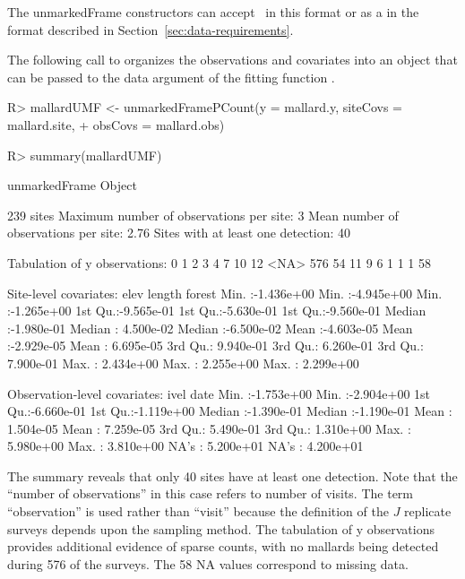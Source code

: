 \documentclass[article,shortnames]{jss}
\newcommand{\ocovs}{\code{obsCovs}}
\begin{document}
{The unmarkedFrame constructors can accept \ocovs\ in this  format or
as a  in the format described in
Section~\ref{sec:data-requirements}.

The following call to  organizes the observations
and covariates into an object that can be passed to the data argument of
the fitting function .

\begin{Schunk}
\begin{Sinput}
R> mallardUMF <- unmarkedFramePCount(y = mallard.y, siteCovs = mallard.site, 
+     obsCovs = mallard.obs)
\end{Sinput}
\end{Schunk}

\begin{Schunk}
\begin{Sinput}
R> summary(mallardUMF)
\end{Sinput}
\begin{Soutput}
unmarkedFrame Object

239 sites
Maximum number of observations per site: 3 
Mean number of observations per site: 2.76 
Sites with at least one detection: 40 

Tabulation of y observations:
   0    1    2    3    4    7   10   12 <NA> 
 576   54   11    9    6    1    1    1   58 

Site-level covariates:
      elev                length               forest          
 Min.   :-1.436e+00   Min.   :-4.945e+00   Min.   :-1.265e+00  
 1st Qu.:-9.565e-01   1st Qu.:-5.630e-01   1st Qu.:-9.560e-01  
 Median :-1.980e-01   Median : 4.500e-02   Median :-6.500e-02  
 Mean   :-4.603e-05   Mean   :-2.929e-05   Mean   : 6.695e-05  
 3rd Qu.: 9.940e-01   3rd Qu.: 6.260e-01   3rd Qu.: 7.900e-01  
 Max.   : 2.434e+00   Max.   : 2.255e+00   Max.   : 2.299e+00  

Observation-level covariates:
      ivel                 date           
 Min.   :-1.753e+00   Min.   :-2.904e+00  
 1st Qu.:-6.660e-01   1st Qu.:-1.119e+00  
 Median :-1.390e-01   Median :-1.190e-01  
 Mean   : 1.504e-05   Mean   : 7.259e-05  
 3rd Qu.: 5.490e-01   3rd Qu.: 1.310e+00  
 Max.   : 5.980e+00   Max.   : 3.810e+00  
 NA's   : 5.200e+01   NA's   : 4.200e+01  
\end{Soutput}
\end{Schunk}

The summary reveals that only 40 sites have at least one
detection. Note that the ``number of observations'' in this case refers to
number of visits. The term ``observation'' is used rather than ``visit''
because the definition of the $J$ replicate surveys depends upon the
sampling method. The
tabulation of y observations provides additional evidence of sparse counts,
with no mallards being detected during 576 of the surveys. The 58 NA values
correspond to missing data.


}
\end{document}
